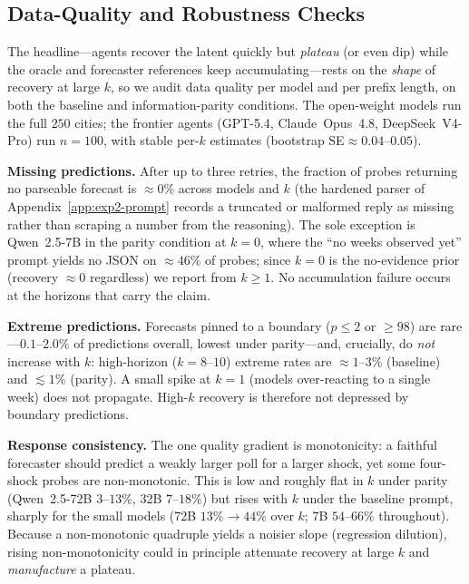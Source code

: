 \documentclass{article} %
\begin{document}
\subsection{Data-Quality and Robustness Checks}
\label{app:exp2-robustness}

The headline---agents recover the latent quickly but \emph{plateau} (or even dip) while the oracle
and forecaster references keep accumulating---rests on the \emph{shape} of recovery at large $k$, so
we audit data quality per model and per prefix length, on both the baseline and information-parity
conditions.  The open-weight models run the full $250$ cities; the frontier agents (GPT-5.4,
Claude~Opus~4.8, DeepSeek~V4-Pro) run $n{=}100$, with stable per-$k$ estimates (bootstrap
SE${\approx}0.04$--$0.05$).

\textbf{Missing predictions.}  After up to three retries, the fraction of probes returning no
parseable forecast is $\approx0\%$ across models and $k$ (the hardened parser of
Appendix~\ref{app:exp2-prompt} records a truncated or malformed reply as missing rather than
scraping a number from the reasoning).  The sole exception is Qwen~2.5-7B in the parity condition at
$k=0$, where the ``no weeks observed yet'' prompt yields no JSON on $\approx46\%$ of probes; since
$k=0$ is the no-evidence prior (recovery $\approx0$ regardless) we report from $k\geq1$.  No
accumulation failure occurs at the horizons that carry the claim.

\textbf{Extreme predictions.}  Forecasts pinned to a boundary ($\hat p\leq2$ or $\geq98$) are
rare---$0.1$--$2.0\%$ of predictions overall, lowest under parity---and, crucially, do \emph{not}
increase with $k$: high-horizon ($k=8$--$10$) extreme rates are $\approx1$--$3\%$ (baseline) and
$\lesssim1\%$ (parity).  A small spike at $k=1$ (models over-reacting to a single week) does not
propagate.  High-$k$ recovery is therefore not depressed by boundary predictions.

\textbf{Response consistency.}  The one quality gradient is monotonicity: a faithful forecaster
should predict a weakly larger poll for a larger shock, yet some four-shock probes are
non-monotonic.  This is low and roughly flat in $k$ under parity (Qwen~2.5-72B $3$--$13\%$, 32B
$7$--$18\%$) but rises with $k$ under the baseline prompt, sharply for the small models (72B
$13\%\!\to\!44\%$ over $k$; 7B $54$--$66\%$ throughout).  Because a non-monotonic quadruple yields a
noisier slope (regression dilution), rising non-monotonicity could in principle attenuate recovery
at large $k$ and \emph{manufacture} a plateau.
\end{document}
